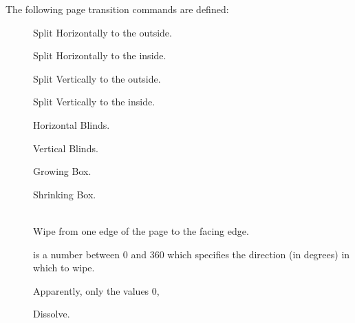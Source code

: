   The following page transition commands are defined:\pause
  \begin{description}
  \item[{}] Split Horizontally to the outside. \pageTransitionSplitHO\pause

  \item[{}] Split Horizontally to the inside. \pageTransitionSplitHI\pause

  \item[{}] Split Vertically to the outside. \pageTransitionSplitVO\pause

  \item[{}] Split Vertically to the inside. \pageTransitionSplitVI\pause

  \item[{}] Horizontal Blinds. \pageTransitionBlindsH\pause

  \item[{}] Vertical Blinds. \pageTransitionBlindsV

    \newslide

  \item[{}] Growing Box. \pageTransitionBoxO\pause

  \item[{}] Shrinking Box. \pageTransitionBoxI\pause
    
  \item[{}]\mbox{}\\
    Wipe from one edge of the page to the facing edge.
    
    \stepwise
    {%
       is a number between $0$ and $360$ which specifies the direction (in degrees) in which to wipe.
    
      Apparently, only the values $0$, 
      }%
    \pause

  \item[{}] Dissolve. \pageTransitionDissolve


\end{description}
